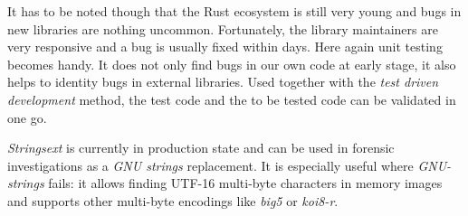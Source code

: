 \documentclass[final,5p,times,twocolumn]{elsarticle}
\begin{document}
It has to be noted though that the Rust ecosystem is still very young
and bugs in new libraries are nothing uncommon. Fortunately, the library
maintainers are very responsive and a bug is usually fixed within days.
Here again unit testing becomes handy. It does not only find bugs in our
own code at early stage, it also helps to identity bugs in external
libraries. Used together with the \emph{test driven development} method,
the test code and the to be tested code can be validated in one go.

\emph{Strings­ext} is currently in production state and can be used in forensic
investigations as a \emph{GNU strings} replacement. It is especially useful
where \emph{GNU-strings} fails: it allows finding UTF-16 multi-byte
characters in memory images and supports other multi-byte encodings like
\emph{big5} or \emph{koi8-r}. 



\end{document}
